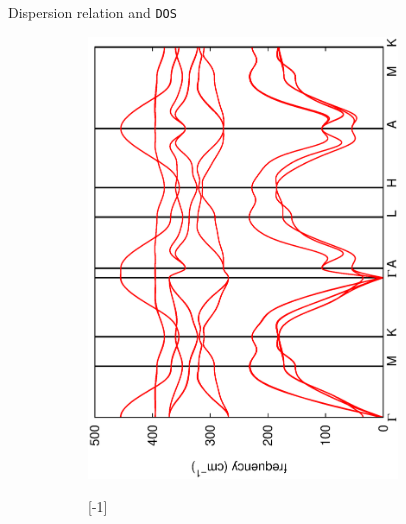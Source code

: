 \documentclass[dvipsnames]{beamer}
\begin{document}
	\begin{frame}{Dispersion relation and \texttt{DOS}}
	\begin{figure}
	\begin{subfigure}{0.7\textwidth}
	\vspace{-0.7cm}
	\includegraphics[trim=0 3cm 0 1cm,angle=-90,origin=c,width=0.9\textwidth, height=0.8\textheight]{graphs/mos2.dispersions.ps}
	\end{subfigure}
	\begin{subfigure}{0.25\textwidth}
	\scalebox{1}[-1]{
}
\end{subfigure}
\end{figure}
\end{frame}
\end{document}
